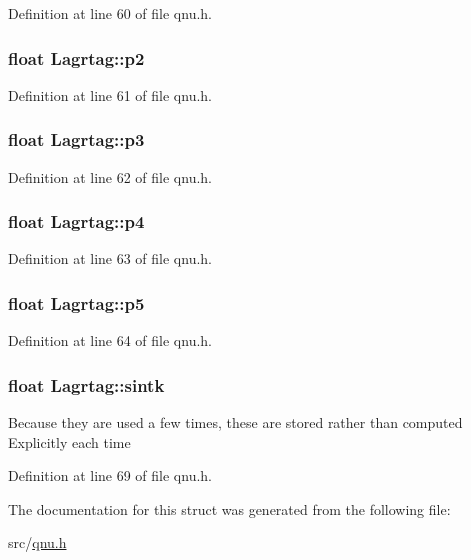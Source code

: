 Definition at line 60 of file qnu.\-h.

\hypertarget{struct_lagrtag_a15a267dd9d5863cb89e3c77b8e7d9ea9}{
\subsubsection[{p2}]{\setlength{\rightskip}{0pt plus 5cm}float Lagrtag\-::p2}}\label{struct_lagrtag_a15a267dd9d5863cb89e3c77b8e7d9ea9}


Definition at line 61 of file qnu.\-h.

\hypertarget{struct_lagrtag_ae25d9be769b1e7502c173c57702d9996}{
\subsubsection[{p3}]{\setlength{\rightskip}{0pt plus 5cm}float Lagrtag\-::p3}}\label{struct_lagrtag_ae25d9be769b1e7502c173c57702d9996}


Definition at line 62 of file qnu.\-h.

\hypertarget{struct_lagrtag_a7c9cd37533fca3d93d9e26c21bd18e75}{
\subsubsection[{p4}]{\setlength{\rightskip}{0pt plus 5cm}float Lagrtag\-::p4}}\label{struct_lagrtag_a7c9cd37533fca3d93d9e26c21bd18e75}


Definition at line 63 of file qnu.\-h.

\hypertarget{struct_lagrtag_aa53127488b4e72a3328a66d6da022f79}{
\subsubsection[{p5}]{\setlength{\rightskip}{0pt plus 5cm}float Lagrtag\-::p5}}\label{struct_lagrtag_aa53127488b4e72a3328a66d6da022f79}


Definition at line 64 of file qnu.\-h.

\hypertarget{struct_lagrtag_ae806547ee3be937865c70095c33fa01f}{
\subsubsection[{sintk}]{\setlength{\rightskip}{0pt plus 5cm}float Lagrtag\-::sintk}}\label{struct_lagrtag_ae806547ee3be937865c70095c33fa01f}
Because they are used a few times, these are stored rather than computed Explicitly each time 

Definition at line 69 of file qnu.\-h.



The documentation for this struct was generated from the following file\-:\begin{DoxyCompactItemize}
\item 
src/\hyperlink{qnu_8h}{qnu.\-h}\end{DoxyCompactItemize}

